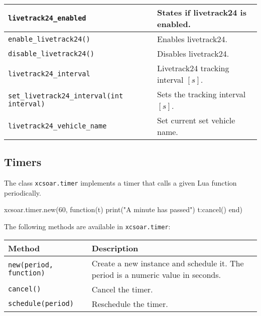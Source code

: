 \begin{maxipage}
\begin{tabularx}{1.9\textwidth}{l|X}
\hline

\verb|livetrack24_enabled| & States if livetrack24 is enabled.\\

\hline

\verb|enable_livetrack24()| & Enables livetrack24.\\

\hline

\verb|disable_livetrack24()| & Disables livetrack24.\\

\hline

\verb|livetrack24_interval| & Livetrack24 tracking interval $[s]$.\\

\hline

\verb|set_livetrack24_interval(int interval)| & Sets the tracking interval $[s]$.\\

\hline

\verb|livetrack24_vehicle_name| & Set current set vehicle name.\\

\end{tabularx}
\end{maxipage}

\subsection{Timers}

The class \verb|xcsoar.timer| implements a timer that calls a given
Lua function periodically.

\begin{lua}
xcsoar.timer.new(60, function(t)
  print("A minute has passed")
  t:cancel()
end)
\end{lua}

The following methods are available in \verb|xcsoar.timer|:

\begin{maxipage}
\begin{tabularx}{1.9\textwidth}{l|X}
Method & Description \\
\hline\hline

\verb|new(period, function)| & Create a new instance and schedule
it.  The period is a numeric value in seconds. \\

\hline

\verb|cancel()| & Cancel the timer. \\

\hline

\verb|schedule(period)| & Reschedule the timer. \\

\end{tabularx}
\end{maxipage}

